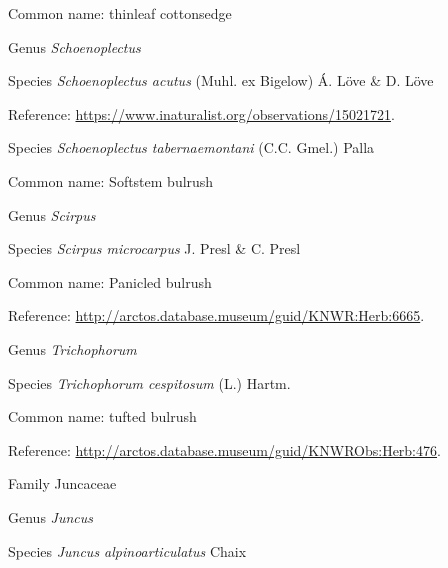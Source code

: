 \documentclass[9pt, article]{memoir}
\begin{document}
\begin{multicols}{2}
Common name: thinleaf cottonsedge

\vspace{6pt}\noindent\hspace{30pt}Genus \textit{Schoenoplectus}


\vspace{6pt}\noindent\hspace{36pt}Species \textit{Schoenoplectus acutus} (Muhl. ex Bigelow) Á. Löve \& D. Löve


Reference: 
\url{https://www.inaturalist.org/observations/15021721}.

\vspace{6pt}\noindent\hspace{36pt}Species \textit{Schoenoplectus tabernaemontani} (C.C. Gmel.) Palla


Common name: Softstem bulrush

\vspace{6pt}\noindent\hspace{30pt}Genus \textit{Scirpus}


\vspace{6pt}\noindent\hspace{36pt}Species \textit{Scirpus microcarpus} J. Presl \& C. Presl


Common name: Panicled bulrush

Reference: 
\url{http://arctos.database.museum/guid/KNWR:Herb:6665}.

\vspace{6pt}\noindent\hspace{30pt}Genus \textit{Trichophorum}


\vspace{6pt}\noindent\hspace{36pt}Species \textit{Trichophorum cespitosum} (L.) Hartm.


Common name: tufted bulrush

Reference: 
\url{http://arctos.database.museum/guid/KNWRObs:Herb:476}.

\vspace{6pt}\noindent\hspace{24pt}Family Juncaceae


\vspace{6pt}\noindent\hspace{30pt}Genus \textit{Juncus}


\vspace{6pt}\noindent\hspace{36pt}Species \textit{Juncus alpinoarticulatus} Chaix



\end{multicols}
\end{document}

